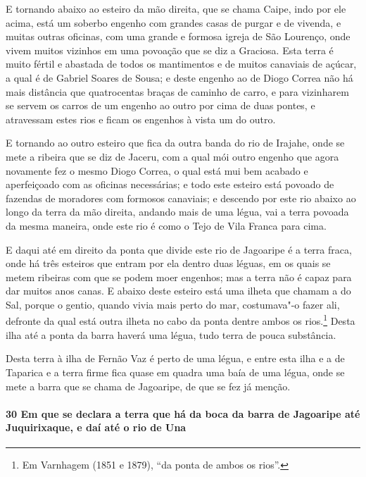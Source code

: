 E tornando abaixo ao esteiro da mão direita, que se chama Caipe, indo por ele acima, está
um soberbo engenho com grandes casas de purgar e de vivenda, e muitas outras oficinas, com
uma grande e formosa igreja de São Lourenço, onde vivem muitos vizinhos em uma povoação
que se diz a Graciosa. Esta terra é muito fértil e abastada de todos os mantimentos e de
muitos canaviais de açúcar, a qual é de Gabriel Soares de Sousa; e deste engenho ao de
Diogo Correa não há mais distância que quatrocentas braças de caminho de carro, e para
vizinharem se servem os carros de um engenho ao outro por cima de duas pontes, e
atravessam estes rios e ficam os engenhos à vista um do outro.

E tornando ao outro esteiro que fica da outra banda do rio de Irajahe, onde se mete a
ribeira que se diz de Jaceru, com a qual mói outro engenho que agora novamente fez o mesmo
Diogo Correa, o qual está mui bem acabado e aperfeiçoado com as oficinas necessárias; e
todo este esteiro está povoado de fazendas de moradores com formosos canaviais; e descendo
por este rio abaixo ao longo da terra da mão direita, andando mais de uma légua, vai a
terra povoada da mesma maneira, onde este rio é como o Tejo de Vila Franca para cima.

E daqui até em direito da ponta que divide este rio de Jagoaripe é a terra fraca, onde há
três esteiros que entram por ela dentro duas léguas, em os quais se metem ribeiras com que
se podem moer engenhos; mas a terra não é capaz para dar muitos anos canas. E abaixo deste
esteiro está uma ilheta que chamam a do Sal, porque o gentio, quando vivia mais perto do
mar, costumava"-o fazer ali, defronte da qual está outra ilheta no cabo da ponta dentre
ambos os rios.\footnote{ Em Varnhagem (1851 e 1879), ``da ponta de ambos os rios''.}
Desta ilha até a ponta da barra haverá uma légua, tudo terra de pouca substância.

Desta terra à ilha de Fernão Vaz é perto de uma légua, e entre esta ilha e a de Taparica e
a terra firme fica quase em quadra uma baía de uma légua, onde se mete a barra que se
chama de Jagoaripe, de que se fez já menção.

\paragraph{30 Em que se declara a terra que há da boca da barra de Jagoaripe até
Juquirixaque, e daí até o rio de Una}

